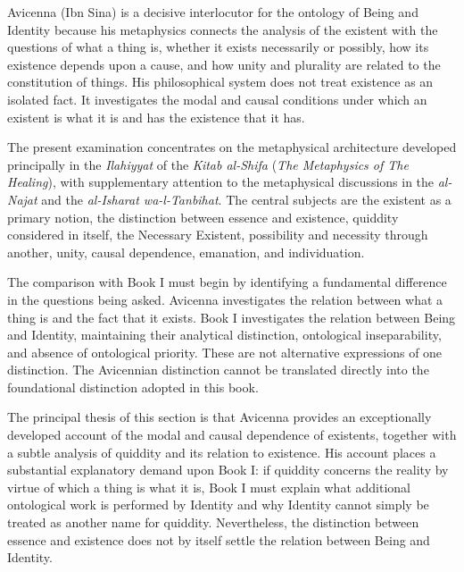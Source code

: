 \label{para:VS.B01.P01.C08.S13.SS01.P001}

Avicenna (Ibn Sina) is a decisive interlocutor for the
ontology of Being and Identity because his metaphysics
connects the analysis of the existent with the questions
of what a thing is, whether it exists necessarily or
possibly, how its existence depends upon a cause, and
how unity and plurality are related to the constitution
of things. His philosophical system does not treat
existence as an isolated fact. It investigates the
modal and causal conditions under which an existent
is what it is and has the existence that it has.

\label{para:VS.B01.P01.C08.S13.SS01.P002}

The present examination concentrates on the metaphysical
architecture developed principally in the
\textit{Ilahiyyat} of the \textit{Kitab al-Shifa}
(\textit{The Metaphysics of The Healing}), with
supplementary attention to the metaphysical discussions
in the \textit{al-Najat} and the
\textit{al-Isharat wa-l-Tanbihat}. The central subjects
are the existent as a primary notion, the distinction
between essence and existence, quiddity considered
in itself, the Necessary Existent, possibility and
necessity through another, unity, causal dependence,
emanation, and individuation.

\label{para:VS.B01.P01.C08.S13.SS01.P003}

The comparison with Book I must begin by identifying
a fundamental difference in the questions being asked.
Avicenna investigates the relation between what a thing
is and the fact that it exists. Book I investigates
the relation between Being and Identity, maintaining
their analytical distinction, ontological inseparability,
and absence of ontological priority. These are not
alternative expressions of one distinction. The
Avicennian distinction cannot be translated directly
into the foundational distinction adopted in this book.

\label{para:VS.B01.P01.C08.S13.SS01.P004}

The principal thesis of this section is that Avicenna
provides an exceptionally developed account of the
modal and causal dependence of existents, together
with a subtle analysis of quiddity and its relation
to existence. His account places a substantial
explanatory demand upon Book I: if quiddity concerns
the reality by virtue of which a thing is what it is,
Book I must explain what additional ontological work
is performed by Identity and why Identity cannot
simply be treated as another name for quiddity.
Nevertheless, the distinction between essence and
existence does not by itself settle the relation
between Being and Identity.


